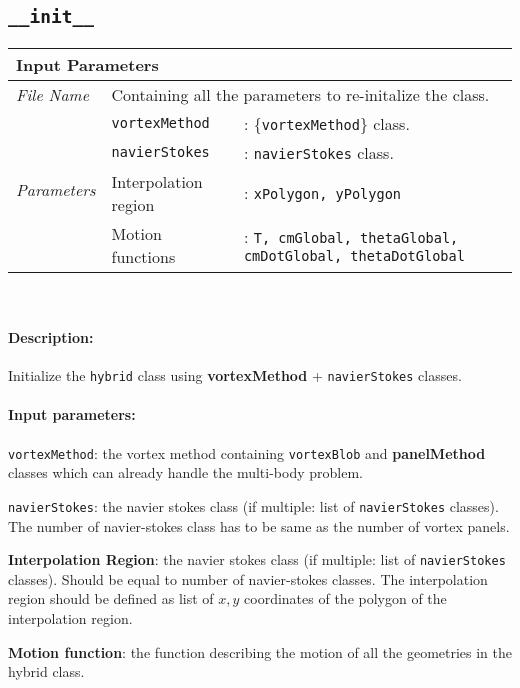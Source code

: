 \subsection{\texttt{\_\_init\_\_}}
	\begin{tabular}{l|lp{7cm}}
		\multicolumn{2}{l}{\textbf{Input Parameters}} & \\ \hline
		\textit{File Name} & \multicolumn{2}{l}{Containing all the parameters to re-initalize the class.} \\ \hline
		\multirow{4}{*}{\textit{Parameters}} & \texttt{vortexMethod} &: \{\texttt{vortexMethod}\} class.\\ \cline{2-3}
		& \texttt{navierStokes} &: \texttt{navierStokes} class. \\ \cline{2-3}
		& Interpolation region &: \texttt{xPolygon, yPolygon}\\ \cline{2-3}
		& Motion functions &: \texttt{T, cmGlobal, thetaGlobal, cmDotGlobal, thetaDotGlobal}\\ \cline{2-3}
	\end{tabular}\\
	
	\paragraph{Description:} Initialize the \texttt{hybrid} class using \textbf{vortexMethod} + \texttt{navierStokes} classes.
	\paragraph{Input parameters:}
	\begin{list}{\quad}{}
	\item \texttt{vortexMethod}: the vortex method containing \texttt{vortexBlob} and \textbf{panelMethod} classes which can already handle the multi-body problem.
	\item \texttt{navierStokes}: the navier stokes class (if multiple: list of \texttt{navierStokes} classes). The number of navier-stokes class has to be same as the number of vortex panels.
	\item \textbf{Interpolation Region}: the navier stokes class (if multiple: list of \texttt{navierStokes} classes). Should be equal to number of navier-stokes classes. The interpolation region should be defined as list of $x,y$ coordinates of the polygon of the interpolation region.
	\item \textbf{Motion function}: the function describing the motion of all the geometries in the hybrid class.
	\end{list}
	
